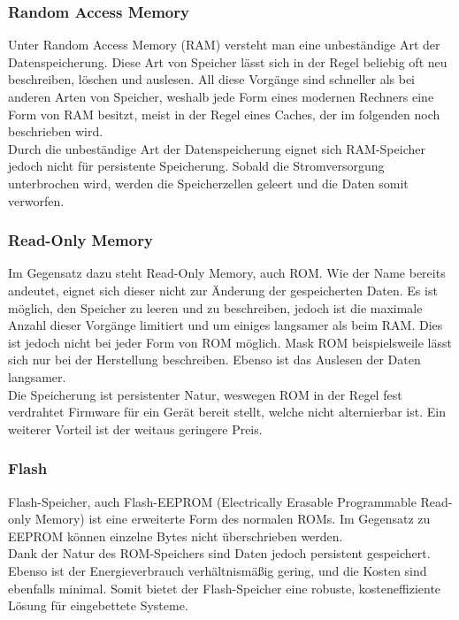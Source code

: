 \subsubsection{Random Access Memory}
Unter Random Access Memory (RAM) versteht man eine unbeständige Art der Datenspeicherung. Diese Art von Speicher lässt sich in der Regel beliebig oft neu beschreiben, löschen und auslesen. All diese Vorgänge sind schneller als bei anderen Arten von Speicher, weshalb jede Form eines modernen Rechners eine Form von RAM besitzt, meist in der Regel eines Caches, der im folgenden noch beschrieben wird.\\
Durch die unbeständige Art der Datenspeicherung eignet sich RAM-Speicher jedoch nicht für persistente Speicherung. Sobald die Stromversorgung unterbrochen wird, werden die Speicherzellen geleert und die Daten somit verworfen.

\subsubsection{Read-Only Memory}
Im Gegensatz dazu steht Read-Only Memory, auch ROM. Wie der Name bereits andeutet, eignet sich dieser nicht zur Änderung der gespeicherten Daten. Es ist möglich, den Speicher zu leeren und zu beschreiben, jedoch ist die maximale Anzahl dieser Vorgänge limitiert und um einiges langsamer als beim RAM. Dies ist jedoch nicht bei jeder Form von ROM möglich. Mask ROM beispielsweile lässt sich nur bei der Herstellung beschreiben. Ebenso ist das Auslesen der Daten langsamer.\\
Die Speicherung ist persistenter Natur, weswegen ROM in der Regel fest verdrahtet Firmware für ein Gerät bereit stellt, welche nicht alternierbar ist. Ein weiterer Vorteil ist der weitaus geringere Preis.

\subsubsection{Flash}
Flash-Speicher, auch Flash-EEPROM (Electrically Erasable Programmable Read-only Memory) ist eine erweiterte Form des normalen ROMs. Im Gegensatz zu EEPROM können einzelne Bytes nicht überschrieben werden.\\
Dank der Natur des ROM-Speichers sind Daten jedoch persistent gespeichert. Ebenso ist der Energieverbrauch verhältnismäßig gering, und die Kosten sind ebenfalls minimal. Somit bietet der Flash-Speicher eine robuste, kosteneffiziente Lösung für eingebettete Systeme.

